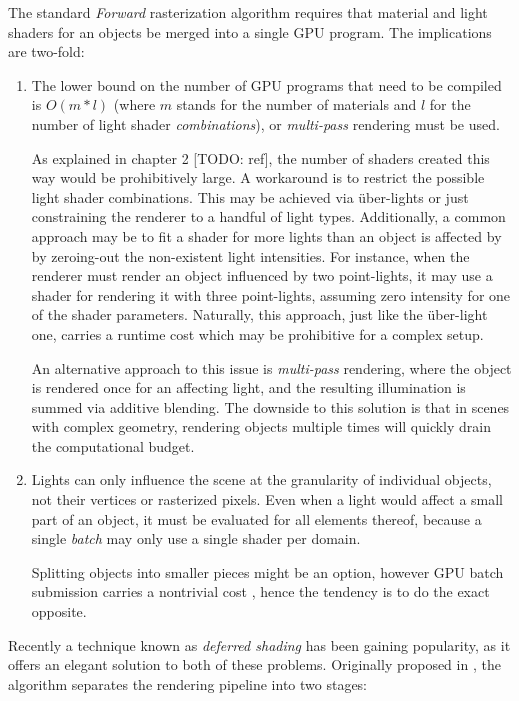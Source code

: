 The standard \emph{Forward} rasterization algorithm requires that material and light shaders for an objects be merged into a single GPU program. The implications are two-fold:
\begin{enumerate}
\item The lower bound on the number of GPU programs that need to be compiled is $O(m * l)$ (where $m$ stands for the number of materials and $l$ for the number of light shader \emph{combinations}), or \emph{multi-pass} rendering must be used.

As explained in chapter 2 [TODO: ref], the number of shaders created this way would be prohibitively large. A workaround is to restrict the possible light shader combinations. This may be achieved via über-lights \cite{UberLights, UberLightsCg} or just constraining the renderer to a handful of light types. Additionally, a common approach may be to fit a shader for more lights than an object is affected by by zeroing-out the non-existent light intensities. For instance, when the renderer must render an object influenced by two point-lights, it may use a shader for rendering it with three point-lights, assuming zero intensity for one of the shader parameters. Naturally, this approach, just like the über-light one, carries a runtime cost which may be prohibitive for a complex setup.

An alternative approach to this issue is \emph{multi-pass} rendering, where the object is rendered once for an affecting light, and the resulting illumination is summed via additive blending. The downside to this solution is that in scenes with complex geometry, rendering objects multiple times will quickly drain the computational budget.

\item Lights can only influence the scene at the granularity of individual objects, not their vertices or rasterized pixels. Even when a light would affect a small part of an object, it must be evaluated for all elements thereof, because a single \emph{batch} may only use a single shader per domain.

Splitting objects into smaller pieces might be an option, however GPU batch submission carries a nontrivial cost \cite{BatchBatchBatch}, hence the tendency is to do the exact opposite.
\end{enumerate}

Recently a technique known as \emph{deferred shading} has been gaining popularity, as it offers an elegant solution to both of these problems. Originally proposed in \citet{DeeringDeferred}, the algorithm separates the rendering pipeline into two stages:

